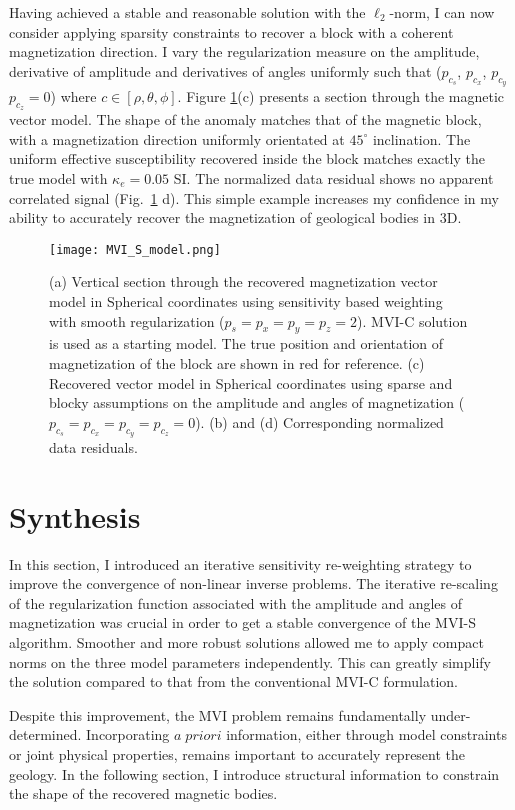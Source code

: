 Having achieved a stable and reasonable solution with the $\ell_2$-norm, I can now consider applying sparsity constraints to recover a block with a coherent magnetization direction.
I vary the regularization measure on the amplitude, derivative of amplitude and derivatives of angles uniformly such that ($p_{c_s}$, $p_{c_x}$, $p_{c_y}$ $p_{c_z} = 0$) where $c\in[\rho, \theta, \phi]$.
Figure \ref{MVI_S_model}(c) presents a section through the magnetic vector model. The shape of the anomaly matches that of the magnetic block, with a magnetization direction uniformly orientated at $45^\circ$ inclination. The uniform effective susceptibility recovered inside the block matches exactly the true model with $\kappa_e=0.05$ SI. The normalized data residual shows no apparent correlated signal (Fig.~\ref{MVI_S_model} d). This simple example increases my confidence in my ability to accurately recover the magnetization of geological bodies in 3D.
\begin{figure}[h!]
\texttt{[image: MVI\_S\_model.png]}
\caption{(a) Vertical section through the recovered magnetization vector model in Spherical coordinates using sensitivity based weighting with smooth regularization ($p_s=p_x=p_y=p_z = 2$). MVI-C solution is used as a starting model. The true position and orientation of magnetization of the block are shown in red for reference. (c) Recovered vector model in Spherical coordinates using sparse and blocky assumptions on the amplitude and angles of magnetization ($p_{c_s}=p_{c_x}=p_{c_y}=p_{c_z} = 0$). (b) and (d) Corresponding normalized data residuals.}
\label{MVI_S_model}
\end{figure}

\section{Synthesis}
In this section, I introduced an iterative sensitivity re-weighting strategy to improve the convergence of non-linear inverse problems.
The iterative re-scaling of the regularization function associated with the amplitude and angles of magnetization was crucial in order to get a stable convergence of the MVI-S algorithm.
Smoother and more robust solutions allowed me to apply compact norms on the three model parameters independently. This can greatly simplify the solution compared to that from the conventional MVI-C formulation.

Despite this improvement, the MVI problem remains fundamentally under-determined. Incorporating $a \; priori$ information, either through model constraints or joint physical properties, remains important to accurately represent the geology. In the following section, I introduce structural information to constrain the shape of the recovered magnetic bodies.

\endinput

